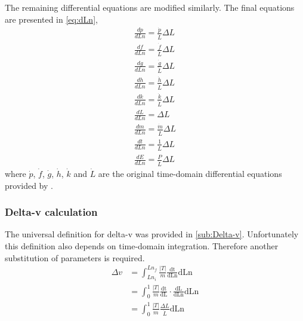 The remaining differential equations are modified similarly. The final equations are presented in \eqref{eq:dLn},
\begin{subequations} \label{eq:dLn}
\begin{gather}
\frac{dp}{dLn}=\frac{\dot{p}}{\dot{L}}\Delta L \\
\frac{df}{dLn}=\frac{\dot{f}}{\dot{L}}\Delta L \\
\frac{dg}{dLn}=\frac{\dot{g}}{\dot{L}}\Delta L \\
\frac{dh}{dLn}=\frac{\dot{h}}{\dot{L}}\Delta L \\
\frac{dk}{dLn}=\frac{\dot{k}}{\dot{L}}\Delta L \\
\frac{dL}{dLn}=\Delta L \\
\frac{dm}{dLn}=\frac{\dot{m}}{\dot{L}}\Delta L \\
\frac{dt}{dLn}=\frac{1}{\dot{L}}\Delta L \\
\frac{dE}{dLn}=\frac{P}{\dot{L}}\Delta L 
\end{gather}
\end{subequations}
where $\dot{p}$, $\dot{f}$,  $\dot{g}$, $\dot{h}$, $\dot{k}$ and $\dot{L}$ are the original time-domain differential equations provided by \textcite{Walker1985}.

\subsubsection{Delta-v calculation}
The universal definition for delta-v was provided in \autoref{sub:Delta-v}. Unfortunately this definition also depends on time-domain integration. Therefore another substitution of parameters is required.
\begin{subequations}
\begin{align}
\Delta v &= \int^{Ln_f}_{Ln_i}\frac{|T|}{m}\frac{\text{dt}}{\text{dLn}}\text{dLn}\\
&= \int^{1}_{0}\frac{|T|}{m}\frac{\text{dt}}{\text{dL}}\cdot\frac{\text{dL}}{\text{dLn}}\text{dLn}\\
&= \int^{1}_{0}\frac{|T|}{m}\frac{\Delta L}{\dot L}\text{dLn}
\end{align}
\end{subequations}


